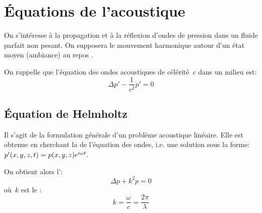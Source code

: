 \medskip
\section{Équations de l'acoustique}\label{Sec-EqFblAcou}
On s'intéresse à la propagation et à la réflexion d'ondes de pression dans un fluide parfait non pesant. On supposera le mouvement harmonique autour d'un état moyen (ambiance) au repos .

\medskip
On rappelle que l'équation des ondes acoustiques de célérité~$c$ dans un milieu est:
\begin{equation}\label{Eq-OndesAcou}
\Delta p' - \dfrac1{c^2} \ddot{p}' = 0
\end{equation}

\medskip
\subsection{Équation de Helmholtz}
Il s'agit de la formulation générale d'un problème acoustique linéaire. Elle est obtenue en cherchant la  de l'équation des ondes, i.e. une solution sous la forme:~$p'(x,y,z,t)=p(x,y,z)\mathrm \mathrm{e}^{i\omega t}$. 

On obtient alors l':
\begin{equation}\label{Eq-Helm} \Delta p + k^2 p=0 \end{equation}
où~$k$ est le :
\begin{equation}
k=\dfrac\omega{c}=\dfrac{2\pi}\lambda
\end{equation}

\medskip
